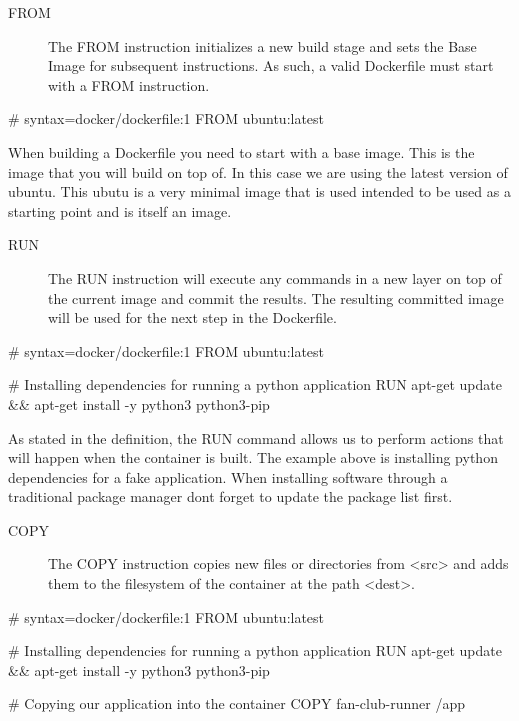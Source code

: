 \documentclass{csse4400}
\begin{document}
\begin{description}
  \item[FROM] The FROM instruction initializes a new build stage and sets the Base Image for subsequent instructions. As such, a valid Dockerfile must start with a FROM instruction. \cite{Dockerfile}
\end{description}

\begin{code}[language=docker,numbers=none]{}
# syntax=docker/dockerfile:1
FROM ubuntu:latest
\end{code}

When building a Dockerfile you need to start with a base image. This is the image that you will build on top of. In this case we are using the latest version of ubuntu. This ubutu is a very minimal image that is used intended to be used as a starting point and is itself an image.

\begin{description}
  \item[RUN] The RUN instruction will execute any commands in a new layer on top of the current image and commit the results. The resulting committed image will be used for the next step in the Dockerfile. \cite{Dockerfile}
\end{description}

\begin{code}[language=docker,numbers=none]{}
  # syntax=docker/dockerfile:1
  FROM ubuntu:latest

  # Installing dependencies for running a python application
  RUN apt-get update && apt-get install -y python3 python3-pip
\end{code}

As stated in the definition, the RUN command allows us to perform actions that will happen when the container is built. The example above is installing python dependencies for a fake application. When installing software through a traditional package manager dont forget to update the package list first.

\begin{description}
  \item[COPY] The COPY instruction copies new files or directories from <src> and adds them to the filesystem of the container at the path <dest>. \cite{Dockerfile}
\end{description}

\begin{code}[language=docker,numbers=none]{}
  # syntax=docker/dockerfile:1
  FROM ubuntu:latest

  # Installing dependencies for running a python application
  RUN apt-get update && apt-get install -y python3 python3-pip

  # Copying our application into the container
  COPY fan-club-runner /app
\end{code}
\end{document}
